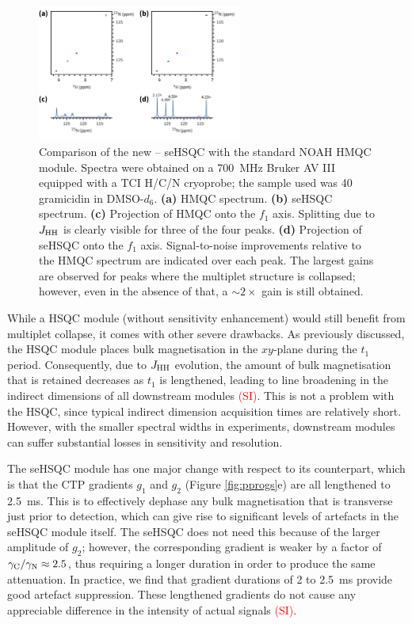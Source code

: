 \documentclass[11pt]{article}
\newcommand*{\carbon}{\ce{^{13}C}}
\newcommand*{\proton}{\ce{^{1}H}}
\newcommand*{\nitrogen}{\ce{^{15}N}}
\newcommand*{\red}[1]{\textcolor{red}{#1}}
\newcommand*{\jhh}{J_{\ce{HH}}}
\newcommand*{\figref}[1]{Figure \ref{fig:#1}}
\newcommand*{\sitodo}{\red{(SI)}}
\newcommand*{\grami}{Spectra were obtained on a \SI{700}{\MHz} Bruker AV III equipped with a TCI H/C/N cryoprobe; the sample used was \SI{40}{\milli\molar} gramicidin in DMSO-$d_6$.}
\begin{document}
\begin{figure}[H]
    \centering
    \includegraphics[width=0.6\textwidth]{./figures/15n_spv2vsm.png}
    \caption{
        Comparison of the new \nitrogen{}--\proton{} seHSQC with the standard NOAH HMQC module.
        \grami{}
        \textbf{(a)} HMQC spectrum.
        \textbf{(b)} seHSQC spectrum.
        \textbf{(c)} Projection of HMQC onto the $f_1$ axis.
        Splitting due to $\jhh$ is clearly visible for three of the four peaks.
        \textbf{(d)} Projection of seHSQC onto the $f_1$ axis.
        Signal-to-noise improvements relative to the HMQC spectrum are indicated over each peak.
        The largest gains are observed for peaks where the multiplet structure is collapsed; however, even in the absence of that, a $\sim 2\times$ gain is still obtained.
    }
    \label{fig:n15}
\end{figure}

While a \nitrogen{} HSQC module (without sensitivity enhancement) would still benefit from multiplet collapse, it comes with other severe drawbacks.
As previously discussed, the HSQC module places bulk magnetisation in the $xy$-plane during the $t_1$ period.
Consequently, due to $\jhh$ evolution, the amount of bulk magnetisation that is retained decreases as $t_1$ is lengthened, leading to line broadening in the indirect dimensions of all downstream modules \sitodo{}.
This is not a problem with the \carbon{} HSQC, since typical \carbon{} indirect dimension acquisition times are relatively short.
However, with the smaller spectral widths in \nitrogen{} experiments, downstream modules can suffer substantial losses in sensitivity and resolution.

The \nitrogen{} seHSQC module has one major change with respect to its \carbon{} counterpart, which is that the CTP gradients $g_1$ and $g_2$ (\figref{pprogs}e) are all lengthened to \SI{2.5}{\ms}.
This is to effectively dephase any bulk magnetisation that is transverse just prior to detection, which can give rise to significant levels of artefacts in the seHSQC module itself.
The \carbon{} seHSQC does not need this because of the larger amplitude of $g_2$; however, the corresponding \nitrogen{} gradient is weaker by a factor of $\gamma_{\ce{C}}/\gamma_{\ce{N}} \approx 2.5$, thus requiring a longer duration in order to produce the same attenuation.
In practice, we find that gradient durations of 2 to \SI{2.5}{\ms} provide good artefact suppression.
These lengthened gradients do not cause any appreciable difference in the intensity of actual signals \sitodo{}.
\end{document}

